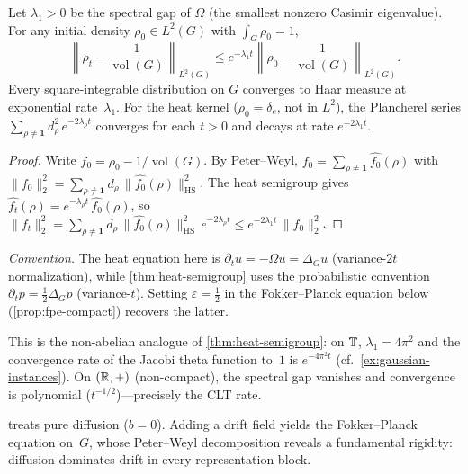 \begin{corollary}\label{cor:spectral-gap}
Let $\lambda_1 > 0$ be the spectral gap of $\Omega$ (the smallest nonzero Casimir eigenvalue). For any initial density $\rho_0 \in L^2(G)$ with $\int_G \rho_0 = 1$,
\[
\left\| \rho_t - \frac{1}{\operatorname{vol}(G)} \right\|_{L^2(G)} \leq e^{-\lambda_1 t}\left\| \rho_0 - \frac{1}{\operatorname{vol}(G)} \right\|_{L^2(G)}.
\]
Every square-integrable distribution on $G$ converges to Haar measure at exponential rate~$\lambda_1$. For the heat kernel ($\rho_0 = \delta_e$, not in $L^2$), the Plancherel series $\sum_{\rho \neq \mathbf{1}} d_\rho^2\, e^{-2\lambda_\rho t}$ converges for each $t > 0$ and decays at rate $e^{-2\lambda_1 t}$.
\end{corollary}

\begin{proof}
Write $f_0 = \rho_0 - 1/\operatorname{vol}(G)$. By Peter--Weyl, $f_0 = \sum_{\rho \neq \mathbf{1}} \widehat{f_0}(\rho)$ with $\|f_0\|_2^2 = \sum_{\rho \neq \mathbf{1}} d_\rho\, \|\widehat{f_0}(\rho)\|_{\mathrm{HS}}^2$. The heat semigroup gives $\widehat{f_t}(\rho) = e^{-\lambda_\rho t}\, \widehat{f_0}(\rho)$, so $\|f_t\|_2^2 = \sum_{\rho \neq \mathbf{1}} d_\rho\, \|\widehat{f_0}(\rho)\|_{\mathrm{HS}}^2\, e^{-2\lambda_\rho t} \leq e^{-2\lambda_1 t}\, \|f_0\|_2^2$.
\end{proof}

\noindent\emph{Convention.} The heat equation here is $\partial_t u = -\Omega u = \Delta_G u$ (variance-$2t$ normalization), while \cref{thm:heat-semigroup} uses the probabilistic convention $\partial_t p = \frac{1}{2}\Delta_G p$ (variance-$t$). Setting $\varepsilon = \frac{1}{2}$ in the Fokker--Planck equation below (\cref{prop:fpe-compact}) recovers the latter.

This is the non-abelian analogue of \cref{thm:heat-semigroup}: on $\mathbb{T}$, $\lambda_1 = 4\pi^2$ and the convergence rate of the Jacobi theta function to~$1$ is $e^{-4\pi^2 t}$ (cf.\ \cref{ex:gaussian-instances}). On $(\mathbb{R}, +)$ (non-compact), the spectral gap vanishes and convergence is polynomial ($t^{-1/2}$)---precisely the CLT rate.

 treats pure diffusion ($b = 0$). Adding a drift field yields the Fokker--Planck equation on~$G$, whose Peter--Weyl decomposition reveals a fundamental rigidity: diffusion dominates drift in every representation block.

